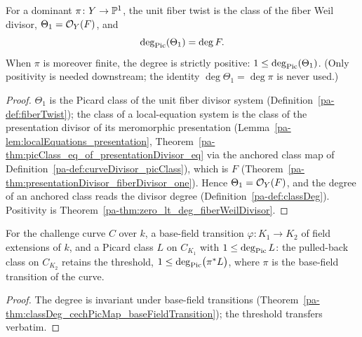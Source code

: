 \begin{theorem}
  \label{pa-thm:classDeg_fiberTwist_one}
  \leanok

  For a dominant \(\pi \colon Y \to \mathbb{P}^1\), the unit fiber twist is the class of the fiber
  Weil divisor, \(\Theta_1 = \mathcal{O}_{Y}(F)\), and
  \[
    \deg_{\operatorname{Pic}}(\Theta_1) = \deg F .
  \]
  When \(\pi\) is moreover finite, the degree is strictly positive:
  \(1 \le \deg_{\operatorname{Pic}}(\Theta_1)\). (Only positivity is needed downstream; the identity
  \(\deg \Theta_1 = \deg \pi\) is never used.)
\end{theorem}
\begin{proof}
  \leanok
  \(\Theta_1\) is the Picard class of the unit fiber divisor system
  (Definition~\ref{pa-def:fiberTwist}); the class of a local-equation system is the class of
  the presentation divisor of its meromorphic presentation
  (Lemma~\ref{pa-lem:localEquations_presentation},
  Theorem~\ref{pa-thm:picClass_eq_of_presentationDivisor_eq} via the anchored class map of
  Definition~\ref{pa-def:curveDivisor_picClass}), which is \(F\)
  (Theorem~\ref{pa-thm:presentationDivisor_fiberDivisor_one}). Hence
  \(\Theta_1 = \mathcal{O}_{Y}(F)\), and the degree of an anchored class reads the divisor degree
  (Definition~\ref{pa-def:classDeg}). Positivity is
  Theorem~\ref{pa-thm:zero_lt_deg_fiberWeilDivisor}.
\end{proof}

\begin{theorem}
  \label{pa-thm:one_le_classDeg_baseFieldTransition}
  \leanok

  For the challenge curve \(C\) over \(k\), a base-field transition
  \(\varphi \colon K_1 \to K_2\) of field extensions of \(k\), and a Picard class \(L\) on
  \(C_{K_1}\) with \(1 \le \deg_{\operatorname{Pic}} L\): the pulled-back class on \(C_{K_2}\) retains the
  threshold, \(1 \le \deg_{\operatorname{Pic}}\bigl(\pi^{*}L\bigr)\), where \(\pi\) is the base-field
  transition of the curve.
\end{theorem}
\begin{proof}
  \leanok
  The degree is invariant under base-field transitions
  (Theorem~\ref{pa-thm:classDeg_cechPicMap_baseFieldTransition}); the threshold transfers
  verbatim.
\end{proof}


